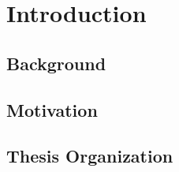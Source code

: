 \documentclass[main.tex]{subfiles}
\begin{document}
  \chapter{Introduction}
  \section{Background}

  \section{Motivation}

  \section{Thesis Organization}
\end{document}

